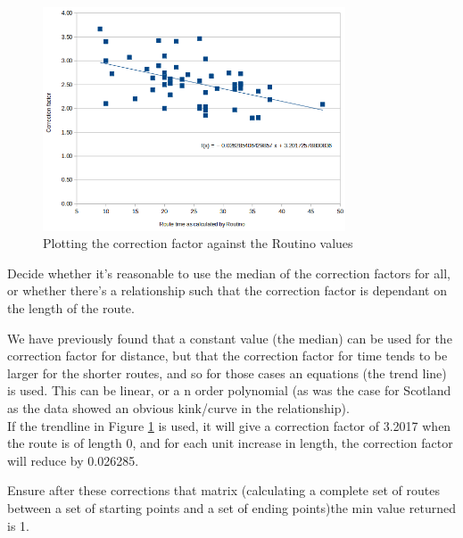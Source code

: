 \documentclass{article}
\begin{document}
\begin{flushleft}
\begin{figure}[!h]
	\centering
	\includegraphics[width=0.8\textwidth]{images/correction_factor_graph.png}
	\caption{Plotting the correction factor against the Routino values}
	\label{fig:correction_factor_graph}
\end{figure}


\vspace{\baselineskip}

Decide whether it's reasonable to use the median of the correction factors for all, or whether there's a relationship such that the correction factor is dependant on the length of the route. 
\vspace{\baselineskip}

We have previously found that a constant value (the median) can be used for the correction factor for distance, but that the correction factor for time tends to be larger for the shorter routes, and so for those cases an equations (the trend line) is used. This can be linear, or a n order polynomial (as was the case for Scotland as the data showed an obvious kink/curve in the relationship).\\
\vspace{\baselineskip}
If the trendline in Figure \ref{fig:correction_factor_graph} is used, it will give a correction factor of 3.2017 when the route is of length 0, and for each unit increase in length, the correction factor will reduce by 0.026285.\\

\vspace{\baselineskip}

Ensure after these corrections that matrix (calculating a complete set of routes between a set of starting points and a set of ending points)the min value returned is 1.


\end{flushleft}
\end{document}
